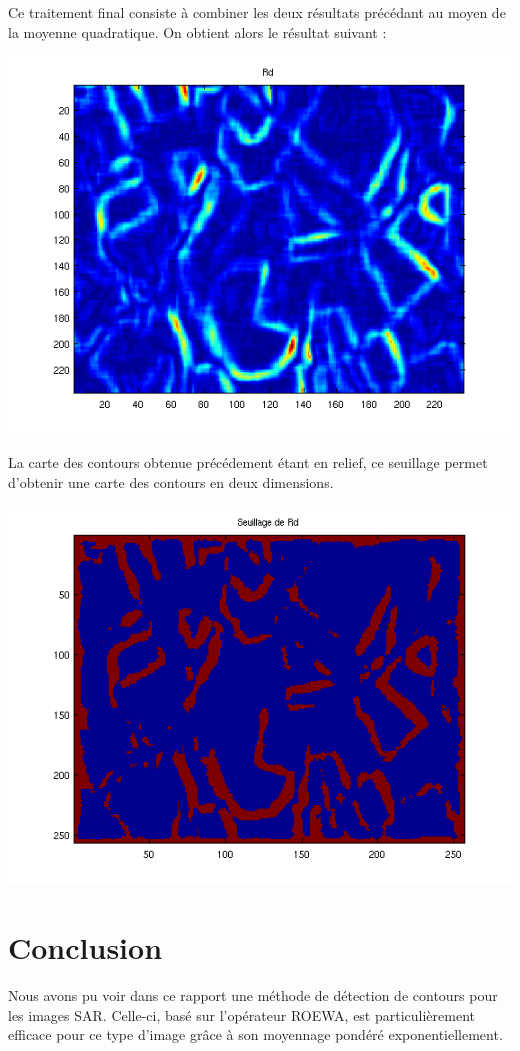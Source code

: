 \documentclass[a4paper,11pt]{article}
\newcommand{\FSource}[1]{%
  
  }
\begin{document}
Ce traitement final consiste à combiner les deux résultats précédant au moyen
de la moyenne quadratique. On obtient alors le résultat suivant :

\includegraphics[width=15cm]{capture4/partie4_07.png}

\FSource{matlab4/4.m}

La carte des contours obtenue précédement étant en relief, ce seuillage permet
d'obtenir une carte des contours en deux dimensions.

\includegraphics[width=15cm]{capture4/partie4_08.png}


\newpage

\section{Conclusion}
Nous avons pu voir dans ce rapport une méthode de détection de contours pour les
images SAR. Celle-ci, basé sur l'opérateur ROEWA, est particulièrement efficace
pour ce type d'image grâce à son moyennage pondéré exponentiellement.
\end{document}
